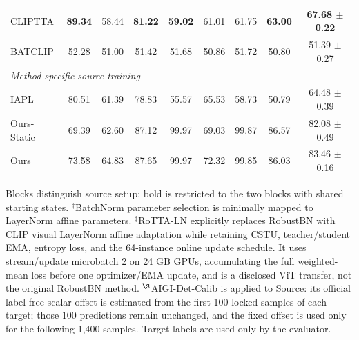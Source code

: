 \begin{table}[t]
{\begin{tabular}{lcccccccc}
CLIPTTA & \textbf{89.34} & 58.44 & \textbf{81.22} & \textbf{59.02} & 61.01 & 61.75 & \textbf{63.00} & \textbf{67.68 $\pm$ 0.22} \\
BATCLIP & 52.28 & 51.00 & 51.42 & 51.68 & 50.86 & 51.72 & 50.80 & 51.39 $\pm$ 0.27 \\
\midrule
\multicolumn{9}{l}{\textit{Method-specific source training}} \\
IAPL & 80.51 & 61.39 & 78.83 & 55.57 & 65.53 & 58.73 & 50.79 & 64.48 $\pm$ 0.39 \\
Ours-Static & 69.39 & 62.60 & 87.12 & 99.97 & 69.03 & 99.87 & 86.57 & 82.08 $\pm$ 0.49 \\
Ours & 73.58 & 64.83 & 87.65 & 99.97 & 72.32 & 99.85 & 86.03 & 83.46 $\pm$ 0.16 \\
\bottomrule
\end{tabular}%
}
\vspace{2pt}
\parbox{\textwidth}{\footnotesize Blocks distinguish source setup; bold is restricted to the two blocks with shared starting states. $^{\dagger}$BatchNorm parameter selection is minimally mapped to LayerNorm affine parameters. $^{\ddagger}$RoTTA-LN explicitly replaces RobustBN with CLIP visual LayerNorm affine adaptation while retaining CSTU, teacher/student EMA, entropy loss, and the 64-instance online update schedule. It uses stream/update microbatch 2 on 24 GB GPUs, accumulating the full weighted-mean loss before one optimizer/EMA update, and is a disclosed ViT transfer, not the original RobustBN method. $^{\S}$AIGI-Det-Calib is applied to Source: its official label-free scalar offset is estimated from the first 100 locked samples of each target; those 100 predictions remain unchanged, and the fixed offset is used only for the following 1,400 samples. Target labels are used only by the evaluator.}
\end{table}
